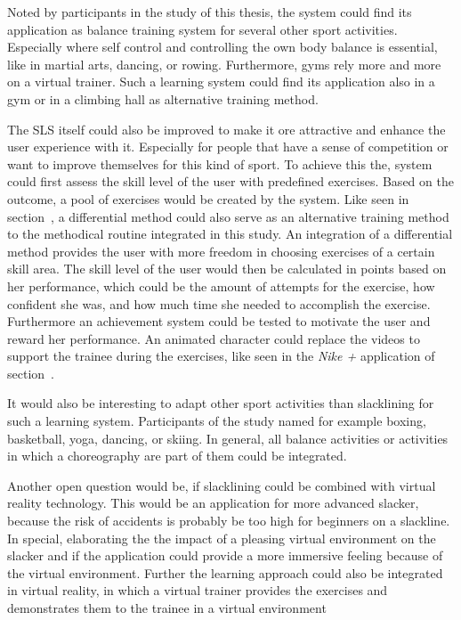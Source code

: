 Noted by participants in the study of this thesis, the system could find its application as balance training system for several other sport activities.
Especially where self control and controlling the own body balance is essential, like in martial arts, dancing, or rowing.
Furthermore, gyms rely more and more on a virtual trainer.
Such a learning system could find its application also in a gym or in a climbing hall as alternative training method.

The SLS itself could also be improved to make it ore attractive and enhance the user experience with it.
Especially for people that have a sense of competition or want to improve themselves for this kind of sport. 
To achieve this the, system could first assess the skill level of the user with predefined exercises.
Based on the outcome, a pool of exercises would be created by the system.
Like seen in section~\textit{}, a differential method could also serve as an alternative training method to the methodical routine integrated in this study.
An integration of a differential method provides the user with more freedom in choosing exercises of a certain skill area.
The skill level of the user would then be calculated in points based on her performance, which could be the amount of attempts for the exercise, how confident she was, and how much time she needed to accomplish the exercise.
Furthermore an achievement system could be tested to motivate the user and reward her performance.
An animated character could replace the videos to support the trainee during the exercises, like seen in the \textit{Nike +} application of section~\textit{}.

It would also be interesting to adapt other sport activities than slacklining for such a learning system.
Participants of the study named for example boxing, basketball, yoga, dancing, or skiing.
In general, all balance activities or activities in which a choreography are part of them could be integrated.

Another open question would be, if slacklining could be combined with virtual reality technology.
This would be an application for more advanced slacker, because the risk of accidents is probably be too high for beginners on a slackline.
In special, elaborating the the impact of a pleasing virtual environment on the slacker and if the application could provide a more immersive feeling because of the virtual environment.
Further the learning approach could also be integrated in virtual reality, in which a virtual trainer provides the exercises and demonstrates them to the trainee in a virtual environment

% 


